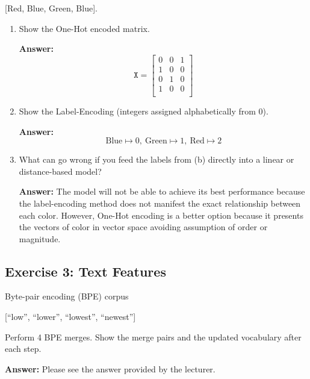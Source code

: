 \documentclass[11pt]{article}
\begin{document}
\begin{center}
    [Red, Blue, Green, Blue].
\end{center}

\begin{enumerate}[label=(\alph*)]
    \item {
        Show the One-Hot encoded matrix. 

        \textbf{Answer:}
        \[
            \texttt{X} = 
            \begin{bmatrix}
            0 & 0 & 1 \\
            1 & 0 & 0 \\
            0 & 1 & 0 \\
            1 & 0 & 0 \\
            \end{bmatrix}
        \]
        }
    \item {
        Show the Label-Encoding (integers assigned alphabetically from 0). 
        
        \textbf{Answer:}
        \[
            \text{Blue} \mapsto 0, \ \text{Green} \mapsto 1, \ \text{Red} \mapsto 2
        \]
        }
    \item {
        What can go wrong if you feed the labels from (b) directly into a linear or distance-based model? 

        \textbf{Answer:} The model will not be able to achieve its best performance because the label-encoding method does not manifest the exact relationship between each color.
        However, One-Hot encoding is a better option because it presents the vectors of color in vector space avoiding assumption of order or magnitude.
        }

\end{enumerate}

\subsection*{Exercise 3: Text Features}

\noindent
Byte-pair encoding (BPE) corpus

\begin{center}
    [``low'', ``lower'', ``lowest'', ``newest'']
\end{center}

\noindent
Perform 4 BPE merges. Show the merge pairs and the updated vocabulary after each step.

\noindent
\textbf{Answer:} Please see the answer provided by the lecturer.
\end{document}
